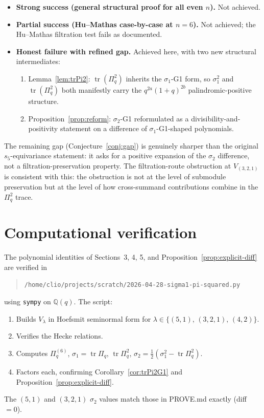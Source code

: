\documentclass{article}
\theoremstyle{definition}
\begin{document}
\begin{itemize}
\item \textbf{Strong success (general structural proof for all even $n$).} Not achieved.
\item \textbf{Partial success (Hu--Mathas case-by-case at $n=6$).} Not achieved; the Hu--Mathas filtration test fails as documented.
\item \textbf{Honest failure with refined gap.} Achieved here, with two new structural intermediates:
\begin{enumerate}
  \item Lemma~\ref{lem:trPi2}: $\operatorname{tr}(\Pi_q^2)$ inherits the $\sigma_1$-G1 form, so $\sigma_1^2$ and $\operatorname{tr}(\Pi_q^2)$ both manifestly carry the $q^{2a}(1+q)^{2b}$ palindromic-positive structure.
  \item Proposition~\ref{prop:reform}: $\sigma_2$-G1 reformulated as a divisibility-and-positivity statement on a difference of $\sigma_1$-G1-shaped polynomials.
\end{enumerate}
\end{itemize}

The remaining gap (Conjecture~\ref{conj:gap}) is genuinely sharper than the
original $s_5$-equivariance statement: it asks for a positive expansion of
the $\sigma_2$ difference, not a filtration-preservation property. The
filtration-route obstruction at $V_{(3,2,1)}$ is consistent with this:
the obstruction is not at the level of submodule preservation but at the
level of how cross-summand contributions combine in the $\Pi_q^2$ trace.

\section{Computational verification}

The polynomial identities of Sections~3, 4, 5, and Proposition~\ref{prop:explicit-diff}
are verified in
\begin{quote}
\verb|/home/clio/projects/scratch/2026-04-28-sigma1-pi-squared.py|
\end{quote}
using \texttt{sympy} on $\mathbb{Q}(q)$. The script:
\begin{enumerate}
  \item Builds $V_\lambda$ in Hoefsmit seminormal form for $\lambda \in \{(5,1),\,(3,2,1),\,(4,2)\}$.
  \item Verifies the Hecke relations.
  \item Computes $\Pi_q^{(6)}$, $\sigma_1=\operatorname{tr}\Pi_q$, $\operatorname{tr}\Pi_q^2$, $\sigma_2 = \tfrac{1}{2}(\sigma_1^2 - \operatorname{tr}\Pi_q^2)$.
  \item Factors each, confirming Corollary~\ref{cor:trPi2G1} and Proposition~\ref{prop:explicit-diff}.
\end{enumerate}
The $(5,1)$ and $(3,2,1)$ $\sigma_2$ values match those in PROVE.md exactly
(diff $=0$).
\end{document}
